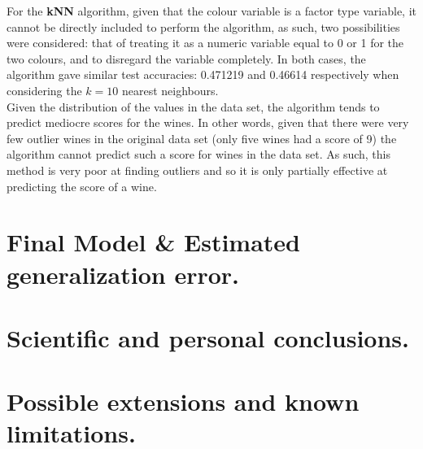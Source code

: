 \documentclass[10pt]{article}
\begin{document}
For the \textbf{kNN} algorithm, given that the colour variable is a factor type variable, it cannot be directly included to perform the algorithm, as such, two possibilities were considered: that of treating it as a numeric variable equal to 0 or 1 for the two colours, and to disregard the variable completely. In both cases, the algorithm gave similar test accuracies: 0.471219 and 0.46614 respectively when considering the $k=10$ nearest neighbours.\\

Given the distribution of the values in the data set, the algorithm tends to predict mediocre scores for the wines. In other words, given that there were very few outlier wines in the original data set (only five wines had a score of 9) the algorithm cannot predict such a score for wines in the data set. As such, this method is very poor at finding outliers and so it is only partially effective at predicting the score of a wine.
\section{Final Model \& Estimated generalization error.}
\section{Scientific and personal conclusions.}
\section{Possible extensions and known limitations.}
\end{document}
